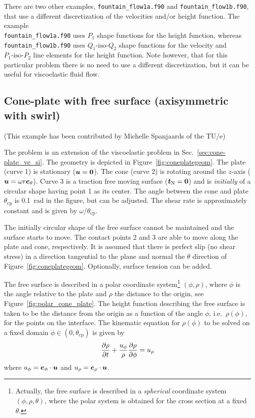 There are two other examples, \texttt{fountain\_flow1a.f90} and \texttt{fountain\_flow1b.f90}, that use a different discretization of the velocities and/or height function. The example \\
\texttt{fountain\_flow1a.f90}
uses $P_1$ shape functions for the height function, whereas \\
\texttt{fountain\_flow1b.f90} uses $Q_1\text{-iso-}Q_2$ shape functions for the velocity and 
$P_1\text{-iso-}P_2$ line elements for the height function. Note however, that for this particular problem there is no need to use a different discretization, but it can be useful for viscoelastic fluid flow.

\subsection{Cone-plate with free surface (axisymmetric with swirl)}
\label{sec:cone-plate_ve_si_fs}

(This example has been contributed by Michelle Spanjaards of the TU/e)

The problem is an extension of the viscoelastic problem in Sec.~\ref{sec:cone-plate_ve_si}.
The geometry is depicted in Figure~\ref{fig:coneplategeom}. The plate (curve 1) is stationary ($\boldsymbol{u}=\boldsymbol{0}$). The cone (curve 2) is rotating around the $z$-axis ($\boldsymbol{u}=\omega r \boldsymbol{e}_\theta$). Curve 3 is a traction free moving surface ($\boldsymbol{t}_\text{N}=\boldsymbol{0}$) and is \emph{initially} of a circular shape having point 1 as its center. The angle between the cone and plate $\theta_\text{cp}$ is 0.1~rad in the figure, but can be adjusted. The shear rate is approximately constant and is given by $\omega/\theta_\text{cp}$. 

The initially circular shape of the free surface cannot be maintained and the surface starts to move.
The contact points 2 and 3 are able to move along the plate and cone, respectively. It is assumed that there is perfect slip (no shear stress) in a direction tangential to the plane and normal the $\theta$ direction of Figure~\ref{fig:coneplategeom}. Optionally, surface tension can be added.

The free surface is described in a polar coordinate system\footnote{Actually, the free surface is described in a \emph{spherical} coordinate system $(\phi,\rho,\theta)$, where the polar system is obtained for the cross section at a fixed $\theta$.} $(\phi,\rho)$, where $\phi$ is the angle relative to the plate and $\rho$ the distance to the origin, see Figure~\ref{fig:polar_cone_plate}. The height function describing the free surface is taken to be the distance from the origin as a function of the angle $\phi$,
i.e.\ $\rho(\phi)$, for the points on the interface. The kinematic equation for $\rho(\phi)$ to be solved on a fixed domain $\phi\in(0,\theta_\text{cp})$ is given by
\[
   \dfrac{\partial \rho}{\partial t}+\frac{u_\phi}{\rho}\dfrac{\partial \rho}{\partial \phi}=u_\rho
\]
where $u_\phi=\boldsymbol{e}_{\phi}\cdot\boldsymbol{u}$ and $u_\rho= \boldsymbol{e}_\rho\cdot \boldsymbol{u}$.

